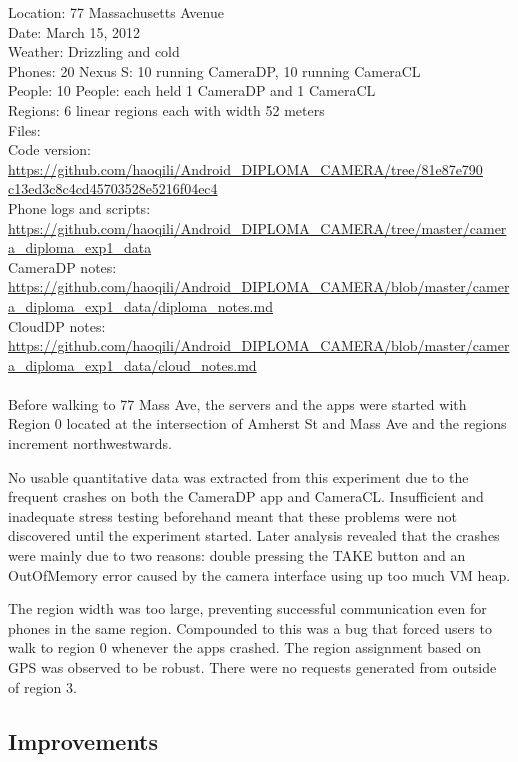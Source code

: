 Location: 77 Massachusetts Avenue\\
Date: March 15, 2012\\
Weather: Drizzling and cold\\
Phones: 20 Nexus S: 10 running CameraDP, 10 running CameraCL\\
People: 10 People: each held 1 CameraDP and 1 CameraCL\\
Regions: 6 linear regions each with width 52 meters\\
Files:\\
Code version: {\url{https://github.com/haoqili/Android_DIPLOMA_CAMERA/tree/81e87e790}}\\
{\url{c13ed3c8c4cd45703528e5216f04ec4}}\\
Phone logs and scripts: {\url{https://github.com/haoqili/Android_DIPLOMA_CAMERA/tree/master/camera_diploma_exp1_data}}\\ 
CameraDP notes: {\url{https://github.com/haoqili/Android_DIPLOMA_CAMERA/blob/master/camera_diploma_exp1_data/diploma_notes.md}}\\
CloudDP notes: {\url{https://github.com/haoqili/Android_DIPLOMA_CAMERA/blob/master/camera_diploma_exp1_data/cloud_notes.md}}\\
\\
Before walking to 77 Mass Ave, the servers and the apps were started with Region 0 located at the intersection of Amherst St and Mass Ave and the regions increment northwestwards.

No usable quantitative data was extracted from this experiment due to the frequent crashes on both the CameraDP app and CameraCL. Insufficient and inadequate stress testing beforehand meant that these problems were not discovered until the experiment started. Later analysis revealed that the crashes were mainly due to two reasons: double pressing the TAKE button and an OutOfMemory error caused by the camera interface using up too much VM heap. 

The region width was too large, preventing successful communication even for phones in the same region. Compounded to this was a bug that forced users to walk to region 0 whenever the apps crashed. The region assignment based on GPS was observed to be robust. There were no requests generated from outside of region 3.

\subsection{Improvements}

